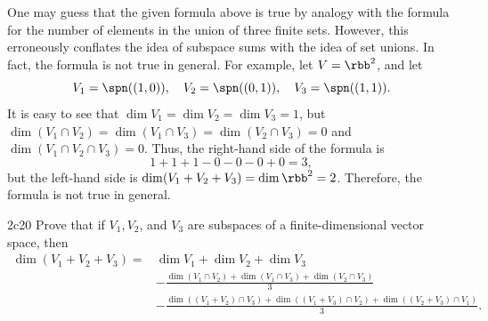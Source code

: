 \begin{sol}
    One may guess that the given formula above is true by analogy with the formula for the number of elements in the union of three finite sets.
	However, this erroneously conflates the idea of subspace sums with the idea of set unions.
	In fact, the formula is not true in general.
	For example, let $V = \rbb^2$, and let
    \[
    	V_1 = \spn((1, 0)), \quad V_2 = \spn((0, 1)), \quad V_3 = \spn((1, 1)).
    \]
    It is easy to see that $\dim V_1 = \dim V_2 = \dim V_3 = 1$, but $\dim(V_1 \cap V_2) = \dim(V_1 \cap V_3) = \dim(V_2 \cap V_3) = 0$ and $\dim(V_1 \cap V_2 \cap V_3) = 0$.
	Thus, the right-hand side of the formula is
    \[
    	1 + 1 + 1 - 0 - 0 - 0 + 0 = 3,
    \]
    but the left-hand side is $\dim(V_1 + V_2 + V_3) = \dim \rbb^2 = 2$.
	Therefore, the formula is not true in general.
\end{sol}

\begin{exercise}{2c20}
    Prove that if $V_1, V_2$, and $V_3$ are subspaces of a finite-dimensional vector space, then
    \begin{align*}
        \dim(V_1 + V_2 + V_3) = & \dim V_1 + \dim V_2 + \dim V_3 \\
        &- \frac{\dim(V_1 \cap V_2) + \dim(V_1 \cap V_3) + \dim(V_2 \cap V_3)}{3} \\
        &- \frac{\dim((V_1 + V_2) \cap V_3) + \dim((V_1 + V_3) \cap V_2) + \dim((V_2 + V_3) \cap V_1)}{3}.
    \end{align*}
\end{exercise}


